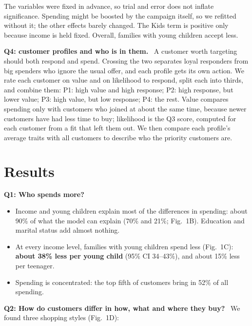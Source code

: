 \documentclass[10pt,letterpaper]{article}
\newcommand{\q}[1]{\par\needspace{2\baselineskip}\textbf{#1}\ }   %
\begin{document}
The variables were fixed in advance, so trial and error does not inflate significance. Spending might be boosted by the campaign itself, so we refitted without it; the other effects barely changed. The Kids term is positive only because income is held fixed. Overall, families with young children accept less.

\q{Q4: customer profiles and who is in them.}
A customer worth targeting should both respond and spend. Crossing the two separates loyal responders from big spenders who ignore the usual offer, and each profile gets its own action. We rate each customer on value and on likelihood to respond, split each into thirds, and combine them:
P1: high value and high response; P2: high response, but lower value; P3: high value, but low response; P4: the rest.
Value compares spending only with customers who joined at about the same time, because newer customers have had less time to buy; likelihood is the Q3 score, computed for each customer from a fit that left them out. We then compare each profile's average traits with all customers to describe who the priority customers are.

\section*{Results}

\q{Q1: Who spends more?}
\begin{itemize}
  \item Income and young children explain most of the differences in spending: about 90\% of what the model can explain (70\% and 21\%; Fig.~1B). Education and marital status add almost nothing.
  \item At every income level, families with young children spend less (Fig.~1C): \textbf{about 38\% less per young child} (95\% CI 34--43\%), and about 15\% less per teenager.
  \item Spending is concentrated: the top fifth of customers bring in 52\% of all spending.
\end{itemize}

\q{Q2: How do customers differ in how, what and where they buy?} We found three shopping styles (Fig.~1D):
\end{document}
